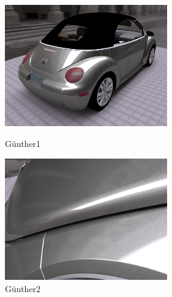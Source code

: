 \begin{figure}[htbp]
 \begin{minipage}{0.4\hsize}
  \begin{center}
   \includegraphics[width=70mm]{./img/back_hq.png}
  \end{center}
  \caption{G\"{u}nther1}
  \label{FGuenther1}
 \end{minipage}
 \begin{minipage}{0.75\hsize}
  \begin{center}
    \includegraphics[width=70mm]{./img/sparkles.png}
  \end{center}
  \caption{G\"{u}nther2}
  \label{FGuenther2}
 \end{minipage}
\end{figure}

